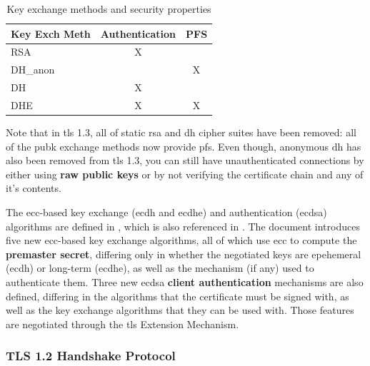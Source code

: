 \documentclass{llncs}
\begin{document}
\begin{table}[]
\centering
\caption{Key exchange methods and security properties}
\label{kemsp}
\begin{tabular}{|l|c|l|}
\hline
\textbf{Key Exch Meth} & \multicolumn{1}{l|}{Authentication} & PFS                    \\ \hline
RSA                          & X                                   &                        \\ \hline
DH\_anon                     & \multicolumn{1}{l|}{}               & \multicolumn{1}{c|}{X} \\ \hline
DH                           & X                                   &                        \\ \hline
DHE                          & X                                   & \multicolumn{1}{c|}{X} \\ \hline
\end{tabular}
\end{table}

Note that in \gls{tls} 1.3, all of static \gls{rsa} and \gls{dh} cipher suites
have been removed: all of the \gls{pubk} exchange methods now provide \gls{pfs}.
Even though, anonymous \gls{dh} has also been removed from \gls{tls} 1.3, you can
still have unauthenticated connections by either using \textbf{raw public keys} \cite{RFC7250}
or by not verifying the certificate chain and any of it's contents.

The \gls{ecc}-based key exchange (\gls{ecdh} and \gls{ecdhe}) and authentication (\gls{ecdsa})
algorithms are defined in  \cite{RFC4292}, which is also referenced
in  \cite{RFC4256}. The document introduces five new
\gls{ecc}-based key exchange algorithms, all of which use \gls{ecc} to compute
the \textbf{premaster secret}, differing only in whether the negotiated
keys are epehemeral (\gls{ecdh}) or long-term (\gls{ecdhe}), as well as the mechanism (if any) used to
authenticate them. Three new \gls{ecdsa} \textbf{client authentication} mechanisms are also defined,
differing in the algorithms that the certificate must be signed with, as well
as the key exchange algorithms that they can be used with.
Those features are negotiated through the \gls{tls} Extension Mechanism.

\subsubsection{TLS 1.2 Handshake Protocol}
\end{document}
